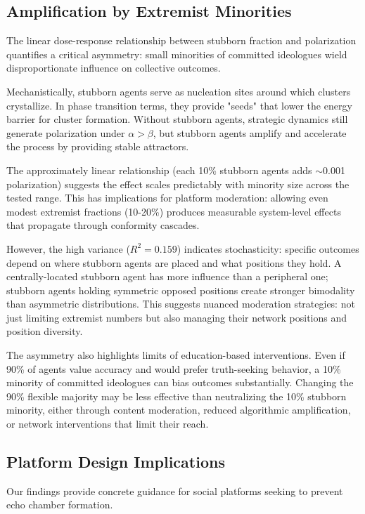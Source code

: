 \documentclass[11pt,a4paper]{article}
\begin{document}
\subsection{Amplification by Extremist Minorities}

The linear dose-response relationship between stubborn fraction and polarization quantifies a critical asymmetry: small minorities of committed ideologues wield disproportionate influence on collective outcomes.

Mechanistically, stubborn agents serve as nucleation sites around which clusters crystallize. In phase transition terms, they provide "seeds" that lower the energy barrier for cluster formation. Without stubborn agents, strategic dynamics still generate polarization under $\alpha > \beta$, but stubborn agents amplify and accelerate the process by providing stable attractors.

The approximately linear relationship (each 10\% stubborn agents adds $\sim$0.001 polarization) suggests the effect scales predictably with minority size across the tested range. This has implications for platform moderation: allowing even modest extremist fractions (10-20\%) produces measurable system-level effects that propagate through conformity cascades.

However, the high variance ($R^2 = 0.159$) indicates stochasticity: specific outcomes depend on where stubborn agents are placed and what positions they hold. A centrally-located stubborn agent has more influence than a peripheral one; stubborn agents holding symmetric opposed positions create stronger bimodality than asymmetric distributions. This suggests nuanced moderation strategies: not just limiting extremist numbers but also managing their network positions and position diversity.

The asymmetry also highlights limits of education-based interventions. Even if 90\% of agents value accuracy and would prefer truth-seeking behavior, a 10\% minority of committed ideologues can bias outcomes substantially. Changing the 90\% flexible majority may be less effective than neutralizing the 10\% stubborn minority, either through content moderation, reduced algorithmic amplification, or network interventions that limit their reach.

\subsection{Platform Design Implications}

Our findings provide concrete guidance for social platforms seeking to prevent echo chamber formation.
\end{document}
